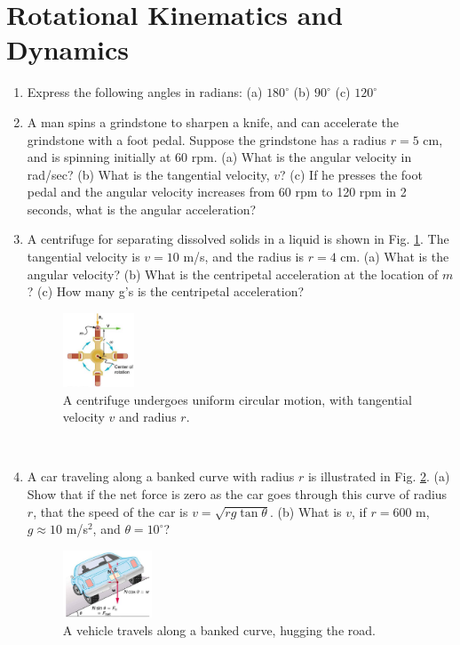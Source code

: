 \documentclass[10pt]{article}
\begin{document}
\section{Rotational Kinematics and Dynamics}
\begin{enumerate}
\item Express the following angles in radians: (a) $180^{\circ}$ (b) $90^{\circ}$ (c) $120^{\circ}$ \\ \vspace{1.75cm}
\item A man spins a grindstone to sharpen a knife, and can accelerate the grindstone with a foot pedal.  Suppose the grindstone has a radius $r=5$ cm, and is spinning initially at 60 rpm.  (a) What is the angular velocity in rad/sec? (b) What is the tangential velocity, $v$? (c) If he presses the foot pedal and the angular velocity increases from 60 rpm to 120 rpm in 2 seconds, what is the angular acceleration? \\ \vspace{2cm}
\item A centrifuge for separating dissolved solids in a liquid is shown in Fig. \ref{fig:cent}.  The tangential velocity is $v=10$ m/s, and the radius is $r=4$ cm.  (a) What is the angular velocity? (b) What is the centripetal acceleration at the location of $m$? (c) How many g's is the centripetal acceleration?
\begin{figure}[ht]
\centering
\includegraphics[width=0.2\textwidth]{figures/centrifuge.png}
\caption{\label{fig:cent} A centrifuge undergoes uniform circular motion, with tangential velocity $v$ and radius $r$.}
\end{figure} \\ \vspace{2cm}
\item A car traveling along a banked curve with radius $r$ is illustrated in Fig. \ref{fig:car}.  (a) Show that if the net force is zero as the car goes through this curve of radius $r$, that the speed of the car is $v = \sqrt{rg\tan\theta}$. (b) What is $v$, if $r=600$ m, $g\approx 10$ m/s$^2$, and $\theta = 10^{\circ}$?
\begin{figure}[ht]
\centering
\includegraphics[width=0.25\textwidth]{figures/car.png}
\caption{\label{fig:car} A vehicle travels along a banked curve, hugging the road.}
\end{figure} \\ \vspace{1cm}
\end{enumerate}
\end{document}
